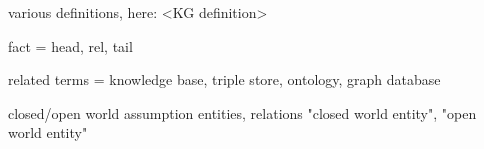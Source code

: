 various definitions, here: <KG definition>

fact = head, rel, tail

related terms = knowledge base, triple store, ontology, graph database

closed/open world assumption
entities, relations
"closed world entity", "open world entity"
